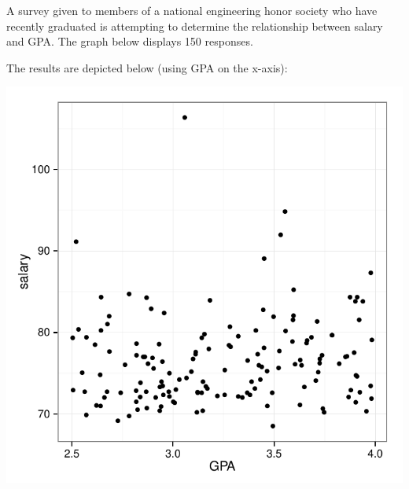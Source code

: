 \documentclass[addpoints]{examsetup}\usepackage[]{graphicx}\usepackage[]{color}
\newenvironment{knitrout}{}{} %
\begin{document}
\begin{questions}
\begin{parts}
%  
%  
%  
%  
%     
%  
%  
%  
%  

\end{parts}
\pagebreak

\question




A survey given to members of a national engineering honor society who have recently graduated is attempting to determine the relationship between salary and GPA.
The graph below displays 150 responses.

The results are depicted below (using GPA on the x-axis):
\begin{center}
\begin{knitrout}
\color{fgcolor}
\includegraphics[width=.5\linewidth]{figure/unnamed-chunk-6-1} 


\end{knitrout}
\end{center}
\end{questions}
\end{document}
